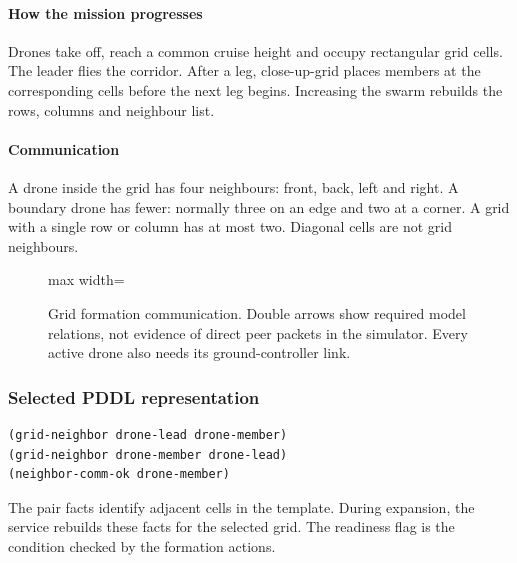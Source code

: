 \documentclass[11pt,a4paper,oneside]{report}
\begin{document}
\paragraph{How the mission progresses}
Drones take off, reach a common cruise height and occupy rectangular grid cells. The leader flies the corridor. After a leg, close-up-grid places members at the corresponding cells before the next leg begins. Increasing the swarm rebuilds the rows, columns and neighbour list.

\paragraph{Communication}
A drone inside the grid has four neighbours: front, back, left and right. A boundary drone has fewer: normally three on an edge and two at a corner. A grid with a single row or column has at most two. Diagonal cells are not grid neighbours.

\begin{figure}[H]
\centering
\begin{adjustbox}{max width=\linewidth}
\end{adjustbox}
\caption[Grid formation communication]{Grid formation communication. Double arrows show required model
relations, not evidence of direct peer packets in the simulator. Every active drone
also needs its ground-controller link.}
\label{fig:comm-grid}
\end{figure}
\subsubsection*{Selected PDDL representation}
\begin{lstlisting}
(grid-neighbor drone-lead drone-member)
(grid-neighbor drone-member drone-lead)
(neighbor-comm-ok drone-member)
\end{lstlisting}
The pair facts identify adjacent cells in the template. During expansion, the service rebuilds these facts for the selected grid. The readiness flag is the condition checked by the formation actions.
\end{document}
